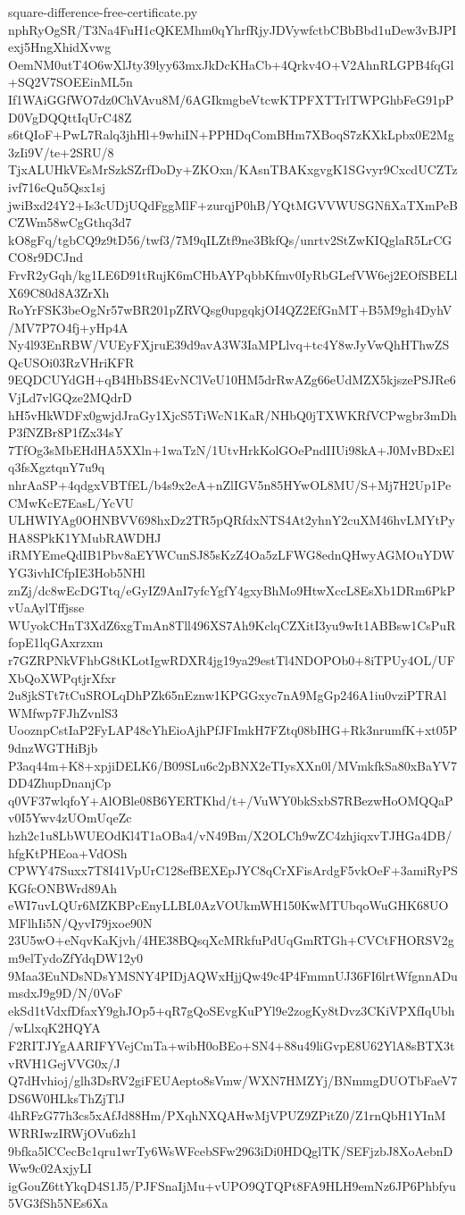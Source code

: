 \documentclass[11pt]{article}
\theoremstyle{definition}
\theoremstyle{remark}
\begin{document}
\begin{filecontents*}[overwrite]{square-difference-free-certificate.py}
nphRyOgSR/T3Na4FuH1cQKEMhm0qYhrfRjyJDVywfctbCBbBbd1uDew3vBJPIexj5HngXhidXvwg
OemNM0utT4O6wXlJty39lyy63mxJkDcKHaCb+4Qrkv4O+V2AhnRLGPB4fqGl+SQ2V7SOEEinML5n
If1WAiGGfWO7dz0ChVAvu8M/6AGIkmgbeVtcwKTPFXTTrlTWPGhbFeG91pPD0VgDQQttIqUrC48Z
s6tQIoF+PwL7Ralq3jhHl+9whiIN+PPHDqComBHm7XBoqS7zKXkLpbx0E2Mg3zIi9V/te+2SRU/8
TjxALUHkVEsMrSzkSZrfDoDy+ZKOxn/KAsnTBAKxgvgK1SGvyr9CxcdUCZTzivf716cQu5Qsx1sj
jwiBxd24Y2+Is3cUDjUQdFggMlF+zurqjP0hB/YQtMGVVWUSGNfiXaTXmPeBCZWm58wCgGthq3d7
kO8gFq/tgbCQ9z9tD56/twf3/7M9qILZtf9ne3BkfQs/unrtv2StZwKIQglaR5LrCGCO8r9DCJnd
FrvR2yGqh/kg1LE6D91tRujK6mCHbAYPqbbKfmv0IyRbGLefVW6ej2EOfSBELlX69C80d8A3ZrXh
RoYrFSK3beOgNr57wBR201pZRVQsg0upgqkjOI4QZ2EfGnMT+B5M9gh4DyhV/MV7P7O4fj+yHp4A
Ny4l93EnRBW/VUEyFXjruE39d9avA3W3IaMPLlvq+tc4Y8wJyVwQhHThwZSQcUSOi03RzVHriKFR
9EQDCUYdGH+qB4HbBS4EvNClVeU10HM5drRwAZg66eUdMZX5kjszePSJRe6VjLd7vlGQze2MQdrD
hH5vHkWDFx0gwjdJraGy1XjcS5TiWcN1KaR/NHbQ0jTXWKRfVCPwgbr3mDhP3fNZBr8P1fZx34sY
7TfOg3sMbEHdHA5XXln+1waTzN/1UtvHrkKolGOePndIIUi98kA+J0MvBDxElq3fsXgztqnY7u9q
nhrAaSP+4qdgxVBTfEL/b4s9x2eA+nZlIGV5n85HYwOL8MU/S+Mj7H2Up1PeCMwKcE7EasL/YcVU
ULHWIYAg0OHNBVV698hxDz2TR5pQRfdxNTS4At2yhnY2cuXM46hvLMYtPyHA8SPkK1YMubRAWDHJ
iRMYEmeQdIB1Pbv8aEYWCunSJ85sKzZ4Oa5zLFWG8ednQHwyAGMOuYDWYG3ivhICfpIE3Hob5NHl
znZj/dc8wEcDGTtq/eGyIZ9AnI7yfcYgfY4gxyBhMo9HtwXccL8EsXb1DRm6PkPvUaAylTffjsse
WUyokCHnT3XdZ6xgTmAn8Tll496XS7Ah9KclqCZXitI3yu9wIt1ABBsw1CsPuRfopE1lqGAxrzxm
r7GZRPNkVFhbG8tKLotIgwRDXR4jg19ya29estTl4NDOPOb0+8iTPUy4OL/UFXbQoXWPqtjrXfxr
2u8jkSTt7tCuSROLqDhPZk65nEznw1KPGGxyc7nA9MgGp246A1iu0vziPTRAlWMfwp7FJhZvnlS3
UooznpCstIaP2FyLAP48cYhEioAjhPfJFImkH7FZtq08bIHG+Rk3nrumfK+xt05P9dnzWGTHiBjb
P3aq44m+K8+xpjiDELK6/B09SLu6c2pBNX2eTIysXXn0l/MVmkfkSa80xBaYV7DD4ZhupDnanjCp
q0VF37wlqfoY+AlOBle08B6YERTKhd/t+/VuWY0bkSxbS7RBezwHoOMQQaPv0I5Ywv4zUOmUqeZc
hzh2c1u8LbWUEOdKl4T1aOBa4/vN49Bm/X2OLCh9wZC4zhjiqxvTJHGa4DB/hfgKtPHEoa+VdOSh
CPWY47Suxx7T8I41VpUrC128efBEXEpJYC8qCrXFisArdgF5vkOeF+3amiRyPSKGfcONBWrd89Ah
eWI7uvLQUr6MZKBPcEnyLLBL0AzVOUkmWH150KwMTUbqoWuGHK68UOMFlhIi5N/QyvI79jxoe90N
23U5wO+eNqvKaKjvh/4HE38BQsqXcMRkfuPdUqGmRTGh+CVCtFHORSV2gm9elTydoZfYdqDW12y0
9Maa3EuNDsNDsYMSNY4PIDjAQWxHjjQw49c4P4FmmnUJ36FI6lrtWfgnnADumsdxJ9g9D/N/0VoF
ekSd1tVdxfDfaxY9ghJOp5+qR7gQoSEvgKuPYl9e2zogKy8tDvz3CKiVPXfIqUbh/wLlxqK2HQYA
F2RITJYgAARIFYVejCmTa+wibH0oBEo+SN4+88u49liGvpE8U62YlA8sBTX3tvRVH1GejVVG0x/J
Q7dHvhioj/glh3DsRV2giFEUAepto8sVmw/WXN7HMZYj/BNmmgDUOTbFaeV7DS6W0HLksThZjTlJ
4hRFzG77h3cs5xAfJd88Hm/PXqhNXQAHwMjVPUZ9ZPitZ0/Z1rnQbH1YInMWRRIwzIRWjOVu6zh1
9bfka5lCCecBc1qru1wrTy6WsWFcebSFw2963iDi0HDQglTK/SEFjzbJ8XoAebnDWw9c02AxjyLI
igGouZ6ttYkqD4S1J5/PJFSnaIjMu+vUPO9QTQPt8FA9HLH9emNz6JP6Phbfyu5VG3fSh5NEs6Xa

\end{filecontents*}
\end{document}
